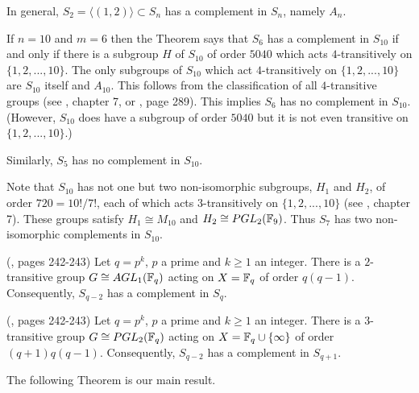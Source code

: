 \begin{corollary} In general, $S_2=\langle (1,2)\rangle \subset S_n$
has a complement in $S_n$, namely $A_n$.
\end{corollary}

\begin{example} If $n=10$ and $m=6$ then the Theorem says that
$S_6$ has a complement in $S_{10}$ if and only if there is a subgroup 
$H$ of $S_{10}$ of order $5040$ which acts $4$-transitively
on $\{1,2,...,10\}$. The only subgroups of $S_{10}$
which act $4$-transitively on $\{1,2,...,10\}$ are $S_{10}$ itself and 
$A_{10}$. This follows from the classification of all 
$4$-transitive groups (see \cite{DM}, chapter 7, or
\cite{R}, page 289). This implies $S_6$ has no complement in
$S_{10}$. (However, $S_{10}$ does have a subgroup of
order $5040$ but it is not even transitive on
$\{1,2,...,10\}$.)

Similarly, $S_5$ has no complement in $S_{10}$. 

Note that $S_{10}$ has not one but two non-isomorphic subgroups,
$H_1$ and $H_2$,
of order $720=10!/7!$, each of which acts $3$-transitively
on $\{1,2,...,10\}$ (see \cite{DM}, chapter 7). These groups satisfy
$H_1\cong M_{10}$ and $H_2\cong PGL_2({{\Bbb F}}_9)$.
Thus $S_7$ has two non-isomorphic complements in $S_{10}$.
\end{example}

\begin{lemma} (\cite{DM}, pages 242-243) 
Let $q=p^k$, $p$ a prime and $k\geq 1$ an integer. 
There is a $2$-transitive group 
$G\cong AGL_1({{\Bbb F}}_q)$ acting on
$X={{\Bbb F}}_q$ of order $q(q-1)$.
Consequently, $S_{q-2}$ has a complement in $S_q$.
\label{2transitive}
\end{lemma}

\begin{lemma} (\cite{DM}, pages 242-243) 
Let $q=p^k$, $p$ a prime and $k\geq 1$ an integer. 
There is a $3$-transitive group 
$G\cong PGL_2({{\Bbb F}}_q)$ acting on
$X={{\Bbb F}}_q\cup \{\infty\}$ of order $(q+1)q(q-1)$.
Consequently, $S_{q-2}$ has a complement in $S_{q+1}$.
\label{3transitive}
\end{lemma}

The following Theorem is our main result.

